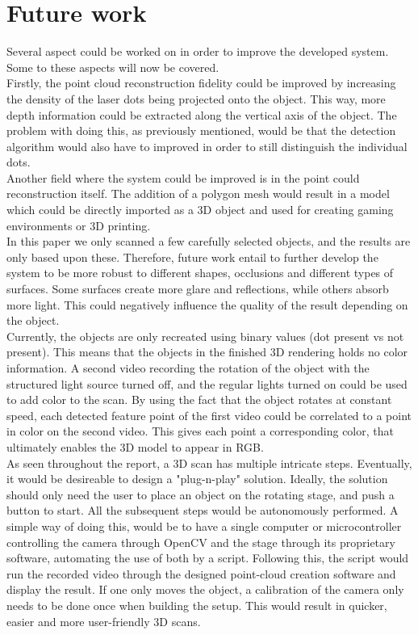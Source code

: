 \newpage
\section{Future work}

Several aspect could be worked on in order to improve the developed system. Some to these aspects will now be covered.\\

Firstly, the point cloud reconstruction fidelity could be improved by increasing the density of the laser dots being projected onto the object. This way, more depth information could be extracted along the vertical axis of the object. The problem with doing this, as previously mentioned, would be that the detection algorithm would also have to improved in order to still distinguish the individual dots.\\   

Another field where the system could be improved is in the point could reconstruction itself. The addition of a polygon mesh would result in a model which could be directly imported as a 3D object and used for creating gaming environments or 3D printing.\\

In this paper we only scanned a few carefully selected objects, and the results are only based upon these. Therefore, future work entail to further develop the system to be more robust to different shapes, occlusions and different types of surfaces. Some surfaces create more glare and reflections, while others absorb more light. This could negatively influence the quality of the result depending on the object. \\

Currently, the objects are only recreated using binary values (dot present vs not present). This means that the objects in the finished 3D rendering holds no color information. A second video recording the rotation of the object with the structured light source turned off, and the regular lights turned on could be used to add color to the scan. By using the fact that the object rotates at constant speed, each detected feature point of the first video could be correlated to a point in color on the second video. This gives each point a corresponding color, that ultimately enables the 3D model to appear in RGB.\\


As seen throughout the report, a 3D scan has multiple intricate steps. Eventually, it would be desireable to design a "plug-n-play" solution. Ideally, the solution should only need the user to place an object on the rotating stage, and push a button to start. All the subsequent steps would be autonomously performed. A simple way of doing this, would be to have a single computer or microcontroller controlling the camera through OpenCV and the stage through its proprietary software, automating the use of both by a script. Following this, the script would run the recorded video through the designed point-cloud creation software and display the result. If one only moves the object, a calibration of the camera only needs to be done once when building the setup. This would result in quicker, easier and more user-friendly 3D scans.


